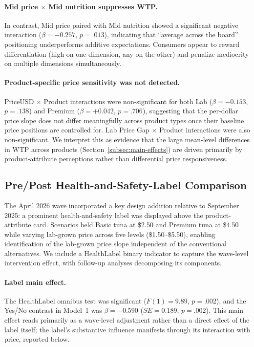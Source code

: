 \paragraph{Mid price $\times$ Mid nutrition suppresses WTP.} In contrast, Mid price paired with Mid nutrition showed a significant negative interaction ($\beta=-0.257$, $p=.013$), indicating that ``average across the board'' positioning underperforms additive expectations. Consumers appear to reward differentiation (high on one dimension, any on the other) and penalize mediocrity on multiple dimensions simultaneously.

\paragraph{Product-specific price sensitivity was not detected.} PriceUSD $\times$ Product interactions were non-significant for both Lab ($\beta=-0.153$, $p=.138$) and Premium ($\beta=+0.042$, $p=.706$), suggesting that the per-dollar price slope does not differ meaningfully across product types once their baseline price positions are controlled for. Lab Price Gap $\times$ Product interactions were also non-significant. We interpret this as evidence that the large mean-level differences in WTP across products (Section~\ref{subsec:main-effects}) are driven primarily by product-attribute perceptions rather than differential price responsiveness.

\subsection{Pre/Post Health-and-Safety-Label Comparison}\label{subsec:healthlabel}

The April 2026 wave incorporated a key design addition relative to September 2025: a prominent health-and-safety label was displayed above the product-attribute card. Scenarios held Basic tuna at \$2.50 and Premium tuna at \$4.50 while varying lab-grown price across five levels (\$1.50--\$5.50), enabling identification of the lab-grown price slope independent of the conventional alternatives. We include a HealthLabel binary indicator to capture the wave-level intervention effect, with follow-up analyses decomposing its components.

\paragraph{Label main effect.} The HealthLabel omnibus test was significant ($F(1)=9.89$, $p=.002$), and the Yes/No contrast in Model~1 was $\beta=-0.590$ ($SE=0.189$, $p=.002$). This main effect reads primarily as a wave-level adjustment rather than a direct effect of the label itself; the label's substantive influence manifests through its interaction with price, reported below.

